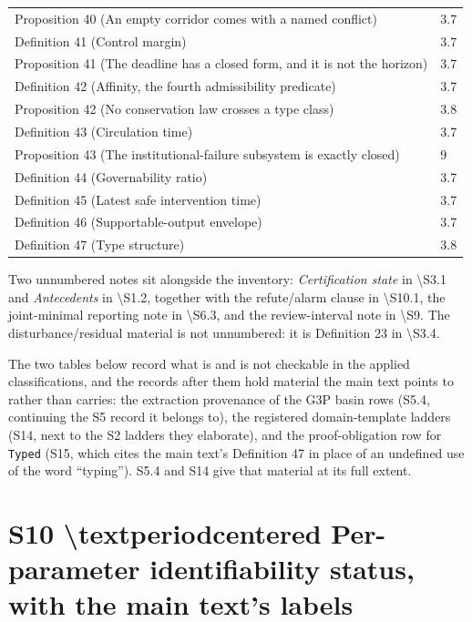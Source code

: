 \documentclass[11pt]{article}
\begin{document}
\begin{longtable}{@{}p{109mm}|l@{}}
Proposition 40 (An empty corridor comes with a named conflict) & 3.7 \\
Definition 41 (Control margin) & 3.7 \\
Proposition 41 (The deadline has a closed form, and it is not the horizon) & 3.7 \\
Definition 42 (Affinity, the fourth admissibility predicate) & 3.7 \\
Proposition 42 (No conservation law crosses a type class) & 3.8 \\
Definition 43 (Circulation time) & 3.7 \\
Proposition 43 (The institutional-failure subsystem is exactly closed) & 9 \\
Definition 44 (Governability ratio) & 3.7 \\
Definition 45 (Latest safe intervention time) & 3.7 \\
Definition 46 (Supportable-output envelope) & 3.7 \\
Definition 47 (Type structure) & 3.8 \\
\bottomrule
\end{longtable}

Two unnumbered notes sit alongside the inventory: \emph{Certification state} in \textbackslash{}S{}3.1 and \emph{Antecedents} in \textbackslash{}S{}1.2, together with the refute/alarm clause in \textbackslash{}S{}10.1, the joint-minimal reporting note in \textbackslash{}S{}6.3, and the review-interval note in \textbackslash{}S{}9. The disturbance/residual material is not unnumbered: it is Definition 23 in \textbackslash{}S{}3.4.

\vspace{0.8em}

The two tables below record what is and is not checkable in the applied classifications, and the records after them hold material the main text points to rather than carries: the extraction provenance of the G3P basin rows (S5.4, continuing the S5 record it belongs to), the registered domain-template ladders (S14, next to the S2 ladders they elaborate), and the proof-obligation row for \texttt{Typed} (S15, which cites the main text's Definition 47 in place of an undefined use of the word ``typing''). S5.4 and S14 give that material at its full extent.

\section*{S10 \textbackslash{}textperiodcentered{} Per-parameter identifiability status, with the main text's labels}\label{s10-textperiodcentered{}-per-parameter-identifiability-status-with-the}
\end{document}
